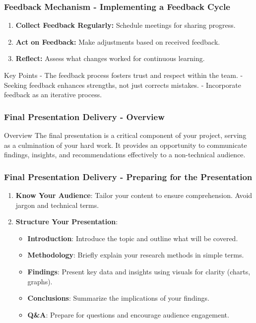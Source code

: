 \documentclass[aspectratio=169]{beamer}
\begin{document}
\begin{frame}[fragile]
    \frametitle{Feedback Mechanism - Implementing a Feedback Cycle}
    \begin{enumerate}
        \item \textbf{Collect Feedback Regularly:} Schedule meetings for sharing progress.
        \item \textbf{Act on Feedback:} Make adjustments based on received feedback.
        \item \textbf{Reflect:} Assess what changes worked for continuous learning.
    \end{enumerate}
    \begin{block}{Key Points}
    - The feedback process fosters trust and respect within the team.
    - Seeking feedback enhances strengths, not just corrects mistakes.
    - Incorporate feedback as an iterative process.
    \end{block}
\end{frame}

\begin{frame}[fragile]
    \frametitle{Final Presentation Delivery - Overview}
    \begin{block}{Overview}
        The final presentation is a critical component of your project, serving as a culmination of your hard work. It provides an opportunity to communicate findings, insights, and recommendations effectively to a non-technical audience.
    \end{block}
\end{frame}

\begin{frame}[fragile]
    \frametitle{Final Presentation Delivery - Preparing for the Presentation}
    \begin{enumerate}
        \item \textbf{Know Your Audience}: Tailor your content to ensure comprehension. Avoid jargon and technical terms.
        \item \textbf{Structure Your Presentation}:
            \begin{itemize}
                \item \textbf{Introduction}: Introduce the topic and outline what will be covered.
                \item \textbf{Methodology}: Briefly explain your research methods in simple terms.
                \item \textbf{Findings}: Present key data and insights using visuals for clarity (charts, graphs).
                \item \textbf{Conclusions}: Summarize the implications of your findings.
                \item \textbf{Q\&A}: Prepare for questions and encourage audience engagement.
            \end{itemize}
    \end{enumerate}
\end{frame}
\end{document}
